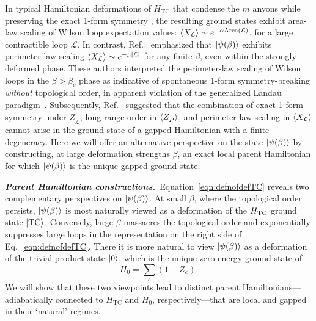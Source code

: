 \documentclass[aps,prl,twocolumn,floatfix,nofootinbib]{revtex4-2}
\theoremstyle{definition}
\newcommand{\TC}{\text{TC}}
\begin{document}
In typical Hamiltonian deformations of $H_{\TC}$ that condense the $m$ anyons while preserving the exact 1-form symmetry \cite{Wegner_duality_1971,KogutRMP1979}, the resulting ground states exhibit area-law scaling of Wilson loop expectation values: $\expval{X_{\mathcal{L}}} \sim e^{-\alpha \text{Area}(\mathcal{L})}$, for a large contractible loop $\mathcal{L}$. In contrast, Ref.~ emphasized that $\ket{\psi(\beta)}$ exhibits perimeter-law scaling $\expval{X_{\mathcal{L}}} \sim e^{-\mu \abs{\mathcal{L}}}$ for any finite $\beta$, even within the strongly deformed phase. These authors interpreted the perimeter-law scaling of Wilson loops in the $\beta > \beta_c$ phase as indicative of spontaneous 1-form symmetry-breaking \emph{without} topological order, in apparent violation of the generalized Landau paradigm~\cite{McGreevyGLP2023}. Subsequently, Ref.~ suggested that the combination of exact 1-form symmetry under $Z_{\tilde{\mathcal{L}}}$, long-range order in $\expval{Z_{\tilde P}}$, and perimeter-law scaling in $\expval{X_{\mathcal{L}}}$ cannot arise in the ground state of a gapped Hamiltonian with a finite degeneracy. Here we will offer an alternative perspective on the state $\ket{\psi(\beta)}$ by constructing, at large deformation strengths $\beta$, an exact local parent Hamiltonian for which $\ket{\psi(\beta)}$ is the unique gapped ground state.



{\bf \emph{Parent Hamiltonian constructions.}}~Equation~\eqref{eqn:defnofdefTC} reveals two complementary perspectives on $\ket{\psi(\beta)}$. At small $\beta$, where the topological order persists, $\ket{\psi(\beta)}$ is most naturally viewed as a deformation of the $H_{\rm TC}$ ground state $\ket{\rm{TC}}$.  Conversely, large $\beta$ massacres the topological order and exponentially suppresses large loops in the representation on the right side of Eq.~\eqref{eqn:defnofdefTC}.  There it is more natural to view $\ket{\psi(\beta)}$ as a deformation of the trivial product state $\ket{0}$, which is the unique zero-energy ground state of
\begin{equation}\label{eqn:H0}
  H_0 = \sum_e (1-Z_e).
\end{equation}
We will show that these two viewpoints lead to distinct parent Hamiltonians---adiabatically connected to $H_{\TC}$ and $H_0$, respectively---that are local and gapped in their `natural' regimes.  
\end{document}
